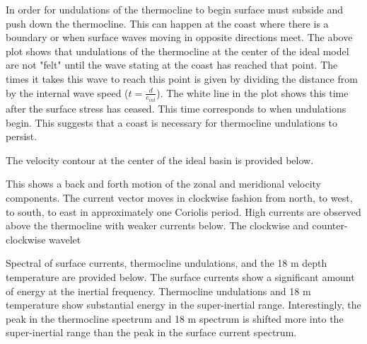 In order for undulations of the thermocline to begin surface must subside and push down the thermocline. This can happen at the coast 
where there is a boundary or when surface waves moving in opposite directions meet. The above plot shows that undulations of the thermocline
at the center of the ideal model are not "felt" until the wave stating at the coast has reached that point. The times it takes
this wave to reach this point is given by dividing the distance from  by the internal wave speed ($t=\frac{d}{c_{int}}$). The white
line in the plot shows this time after the surface stress has ceased. This time corresponds to when undulations begin. 
This suggests that a coast is necessary for thermocline undulations to persist. 

The velocity contour at the center of the ideal basin is provided below. 


This shows a back and forth motion of the zonal and meridional velocity components. The current vector moves in clockwise fashion from north, to west, to south, to east
in approximately one Coriolis period. High currents are observed above the thermocline with weaker currents below. The clockwise and counter-clockwise wavelet 


Spectral of surface currents, thermocline undulations, and the 18 m depth temperature are provided below. The surface currents show a significant amount of energy at
the inertial frequency. Thermocline undulations and 18 m temperature show substantial energy in the super-inertial range. Interestingly, the peak in the thermocline spectrum
and 18 m spectrum is shifted more into the super-inertial range than the peak in the surface current spectrum. 

